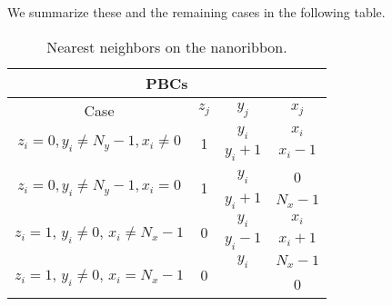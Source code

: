 We summarize these and the remaining cases in the following table.

\begin{table}[H]
	\hspace{-2.5cm}
	\caption{Nearest neighbors on the nanoribbon.}
	\begin{tabular}{|c|c|c|c|} \hline
	\multicolumn{4}{|c|}{\textbf{\acp{PBC}}}							\\ \hline
		Case 				& $z_j$	& $y_j$	& $x_j$ 	\\ \hline
		\multicolumn{1}{|c|}{\multirow{3}{*}{$z_i = 0, y_i \neq N_y - 1, x_i \neq 0$}}	 &	\multicolumn{1}{c|}{\multirow{3}{*}{1}} & \multicolumn{1}{c|}{\multirow{2}{*}{$y_i$}} & $x_i$   \\ \cline{4-4}
	   	\multicolumn{1}{|c|}{}	& \multicolumn{1}{c|}{\multirow{3}{*}{}} & \multicolumn{1}{c|}{\multirow{2}{*}{}}& \multicolumn{1}{c|}{\multirow{2}{*}{$x_i - 1$}} \\ \cline{3-3}
	   	\multicolumn{1}{|c|}{}	& \multicolumn{1}{c|}{} & $y_i +1$ & \multicolumn{1}{c|}{\multirow{2}{*}{}} \\ \hline
		\multicolumn{1}{|c|}{\multirow{3}{*}{$z_i = 0, y_i \neq N_y - 1, x_i = 0$}}	 &	\multicolumn{1}{c|}{\multirow{3}{*}{1}} & \multicolumn{1}{c|}{\multirow{2}{*}{$y_i$}} & 0   \\ \cline{4-4}
	   	\multicolumn{1}{|c|}{}	& \multicolumn{1}{c|}{\multirow{3}{*}{}} & \multicolumn{1}{c|}{\multirow{2}{*}{}}& \multicolumn{1}{c|}{\multirow{2}{*}{$N_x - 1$}} \\ \cline{3-3}
	   	\multicolumn{1}{|c|}{}	& \multicolumn{1}{c|}{} & $y_i +1$ & \multicolumn{1}{c|}{\multirow{2}{*}{}} \\ \hline
		\multicolumn{1}{|c|}{\multirow{3}{*}{$z_i = 1$, $y_i \neq 0$, $x_i \neq N_x - 1$}}	 &	\multicolumn{1}{c|}{\multirow{3}{*}{0}} & \multicolumn{1}{c|}{\multirow{2}{*}{$y_i$}} & $x_i$   \\ \cline{4-4}
	   	\multicolumn{1}{|c|}{}	& \multicolumn{1}{c|}{\multirow{3}{*}{}} & \multicolumn{1}{c|}{\multirow{2}{*}{}}& \multicolumn{1}{c|}{\multirow{2}{*}{$x_i + 1$}} \\ \cline{3-3}
	   	\multicolumn{1}{|c|}{}	& \multicolumn{1}{c|}{} & $y_i -1$ & \multicolumn{1}{c|}{\multirow{2}{*}{}} \\ \hline
		\multicolumn{1}{|c|}{\multirow{3}{*}{$z_i = 1$, $y_i \neq 0$, $x_i = N_x - 1$}}	 &	\multicolumn{1}{c|}{\multirow{3}{*}{0}} & \multicolumn{1}{c|}{\multirow{2}{*}{$y_i$}} & $N_x - 1$   \\ \cline{4-4}
	   	\multicolumn{1}{|c|}{}	& \multicolumn{1}{c|}{\multirow{3}{*}{}} & \multicolumn{1}{c|}{\multirow{2}{*}{}}& \multicolumn{1}{c|}{\multirow{2}{*}{0}} \\ \cline{3-3}

\end{tabular}
\end{table}
